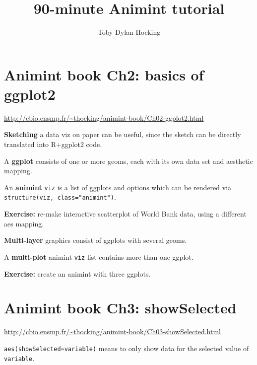 \documentclass{article}
\begin{document}
\title{90-minute Animint tutorial}
\author{Toby Dylan Hocking}
\maketitle
\thispagestyle{empty}

\section*{Animint book Ch2: basics of ggplot2}

\url{http://cbio.ensmp.fr/~thocking/animint-book/Ch02-ggplot2.html}

\hrulefill

\textbf{Sketching} a data viz on paper can be useful, since the sketch
can be directly translated into R+ggplot2 code.

A \textbf{ggplot} consists of one or more geoms, each with its own
data set and aesthetic mapping.

An \textbf{animint} \texttt{viz} is a list of ggplots and options
which can be rendered via \verb|structure(viz, class="animint")|.

\textbf{Exercise:} re-make interactive scatterplot of World Bank data,
using a different aes mapping.

\hrulefill


\textbf{Multi-layer} graphics consist of ggplots with several geoms.

A \textbf{multi-plot} animint \texttt{viz} list contains more than one
ggplot.

\textbf{Exercise:} create an animint with three ggplots.

\section*{Animint book Ch3: showSelected}

\url{http://cbio.ensmp.fr/~thocking/animint-book/Ch03-showSelected.html}

\hrulefill

\texttt{aes(showSelected=variable)} means to only show data for the
selected value of \texttt{variable}.
\end{document}
